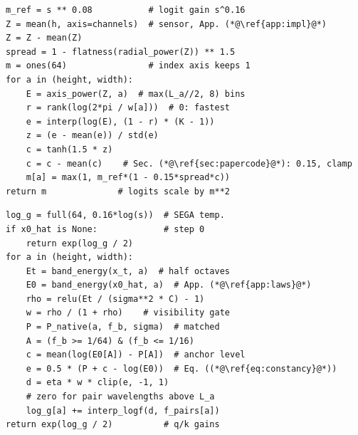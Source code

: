 \begin{algorithm}[t]
\begin{minipage}[t]{0.487\linewidth}
\algrule
\caption{\segaofficial, one gain update}\label{alg:sega}
\vspace{-3pt}
\begin{lstlisting}[style=gold,emph={mean,flatness,radial_power,ones,axis_power,rank,log,interp,std,tanh,max}]
m_ref = s ** 0.08           # logit gain s^0.16
Z = mean(h, axis=channels)  # sensor, App. (*@\ref{app:impl}@*)
Z = Z - mean(Z)
spread = 1 - flatness(radial_power(Z)) ** 1.5
m = ones(64)                # index axis keeps 1
for a in (height, width):
    E = axis_power(Z, a)  # max(L_a//2, 8) bins
    r = rank(log(2*pi / w[a]))  # 0: fastest
    e = interp(log(E), (1 - r) * (K - 1))
    z = (e - mean(e)) / std(e)
    c = tanh(1.5 * z)
    c = c - mean(c)    # Sec. (*@\ref{sec:papercode}@*): 0.15, clamp
    m[a] = max(1, m_ref*(1 - 0.15*spread*c))
return m              # logits scale by m**2
\end{lstlisting}
\vspace{-2pt}\algrule
\end{minipage}\hfill
\begin{minipage}[t]{0.487\linewidth}
\algrule
\caption{\constancytm, one gain update}\label{alg:ctm}
\vspace{-3pt}
\begin{lstlisting}[style=gold,emph={full,log,exp,band_energy,relu,P_native,mean,clip,interp_logf}]
log_g = full(64, 0.16*log(s))  # SEGA temp.
if x0_hat is None:             # step 0
    return exp(log_g / 2)
for a in (height, width):
    Et = band_energy(x_t, a)  # half octaves
    E0 = band_energy(x0_hat, a)  # App. (*@\ref{app:laws}@*)
    rho = relu(Et / (sigma**2 * C) - 1)
    w = rho / (1 + rho)    # visibility gate
    P = P_native(a, f_b, sigma)  # matched
    A = (f_b >= 1/64) & (f_b <= 1/16)
    c = mean(log(E0[A]) - P[A])  # anchor level
    e = 0.5 * (P + c - log(E0))  # Eq. ((*@\ref{eq:constancy}@*))
    d = eta * w * clip(e, -1, 1)
    # zero for pair wavelengths above L_a
    log_g[a] += interp_logf(d, f_pairs[a])
return exp(log_g / 2)          # q/k gains
\end{lstlisting}
\vspace{-2pt}\algrule
\end{minipage}
\end{algorithm}

